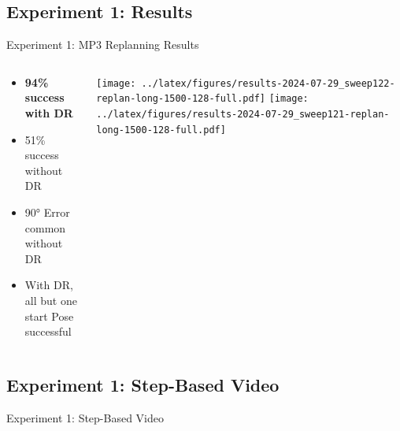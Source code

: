 \documentclass[16:9,en,navbarinfooter]{sdqbeamer}
\begin{document}
\subsection{Experiment 1: Results}
\begin{frame}{Experiment 1: MP3 Replanning Results}
	\begin{columns}[t]
		\begin{column}{0.3\textwidth}
			\vspace{1cm}
			\begin{itemize}
				\item \textbf{94\% success with DR}
				\item 51\% success without DR
				\item 90° Error common without DR
				\item With DR, all but one start Pose successful
			\end{itemize}
		\end{column}
		\begin{column}{0.7\textwidth}
			\vspace{1cm}
			\texttt{[image: ../latex/figures/results-2024-07-29\_sweep122-replan-long-1500-128-full.pdf]}
			\texttt{[image: ../latex/figures/results-2024-07-29\_sweep121-replan-long-1500-128-full.pdf]}\\
		\end{column}
	\end{columns}
\end{frame}


\subsection{Experiment 1: Step-Based Video}
\begin{frame}{Experiment 1: Step-Based Video}

	\begin{columns}[t]
		\vspace{1cm}

	\end{columns}
\end{frame}
\end{document}
